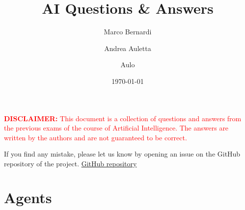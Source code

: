\documentclass[12pt]{article}
\title{AI Questions \& Answers}
\author{
    Marco Bernardi
    \and
    Andrea Auletta
    \and
    Aulo
}
\date{\today}
\begin{document}
\maketitle
\textcolor{red}
{\textbf{DISCLAIMER:} This document is a collection of questions and answers from the previous exams of the course of Artificial Intelligence.
    The answers are written by the authors and are not guaranteed to be correct.}
\bigskip

If you find any mistake, please let us know by opening an issue on the GitHub repository of the project.
\href{https://github.com/marco-bernardi/AI-UniPD}{GitHub repository}
\newpage
\tableofcontents

\section{Agents}
\end{document}
